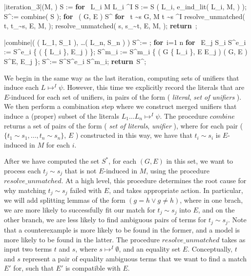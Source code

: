 \documentclass{llncs}
\def\RETURN{\keyword{return}\ }
\def\ENDPROC{\untab}
\def\DOFOR{\qtab\keyword{for}\ }
\def\ENDFOR{\untab}
\def\keyword#1{\mbox{\normalshape\bf #1}}
\begin{document}
\begin{minipage}[t]{.4\linewidth}
\begin{program}
\PROC |iteration\_3|(M, \psi) \BODY
S := \emptyset
\DOFOR {} L_i \in M  L_i \mapsto^I \psi
  S := S \cup ( L_i, e\_ind\_lit( L_i, M, \psi ) );
\ENDFOR
S^\ast := combine( S );
\DOFOR {} ( G, E ) \in S^\ast 
  \DOFOR {} t \sim s \not\in G, \in M  t \sim s \mapsto^I \psi
    resolve\_unmatched( t, t_{\sim s}, E, M, \psi );
    resolve\_unmatched( s, s_{\sim t}, E, M, \psi );
  \ENDFOR
\ENDFOR
\RETURN \emptyset;
\ENDPROC
\end{program}
\begin{program}
\PROC |combine|( ( L_1, S_1 ), \ldots ( L_n, S_n ) ) \BODY
S^\ast := \emptyset;
\DOFOR i=1 \TO n
  \DOFOR {} E_j \in S_i
    S^e_i := S^e_i \cup \{ ( \{ L_i \}, E_j ) \};
    S^m_i := S^m_i \cup \{ ( G \cup \{ L_i \}, E \cup E_j ) \mid ( G, E ) \in S^\ast \wedge E, E_j  \};
  \ENDFOR
  S^\ast := S^\ast \cup S^e_i \cup S^m_i;
\ENDFOR
\RETURN S^\ast;
\ENDPROC
\end{program}
\end{minipage}

We begin in the same way as the last iteration, computing sets of unifiers that induce each $L \mapsto^I \psi$.
However, this time we explicitly record the literals that are $E$-induced for each set of unifiers, in pairs of the form ( \emph{literal}, \emph{set of unifiers} ).
We then perform a combination step where we construct merged unifiers that induce a (proper) subset of the literals $L_1 \ldots L_n \mapsto^I \psi$.
The procedure $combine$ returns a set of pairs of the form ( \emph{set of literals}, \emph{unifier} ), where for each pair ( $\{ t_1 \sim s_1, \ldots, t_n \sim s_n \}$, $E$ ) constructed in this way, we have that $t_i \sim s_i$ is $E$-induced in $M$ for each $i$.

After we have computed the set $S^\ast$, for each $(G, E)$ in this set, we want to process each $t_j \sim s_j$ that is not $E$-induced in $M$, using the procedure $resolve\_unmatched$.
At a high level, this procedure determines the root cause for why matching $t_j \sim s_j$ failed with $E$, and takes appropriate action.
In particular, we will add splitting lemmas of the form $( g = h \vee g \neq h )$, where in one brach, we are more likely to successfully fit our match for $t_j \sim s_j$ into $E$, and on the other branch, we are less likely to find ambiguous pairs of terms for $t_j \sim s_j$.
Note that a counterexample is more likely to be found in the former, and a model is more likely to be found in the latter.
The procedure $resolve\_unmatched$ takes as input two terms $t$ and $s$, where $s \mapsto^I \emptyset$, and an equality set $E$.
Conceptually, $t$ and $s$ represent a pair of equality ambiguous terms that we want to find a match $E'$ for, such that $E'$ is compatible with $E$.
\end{document}
